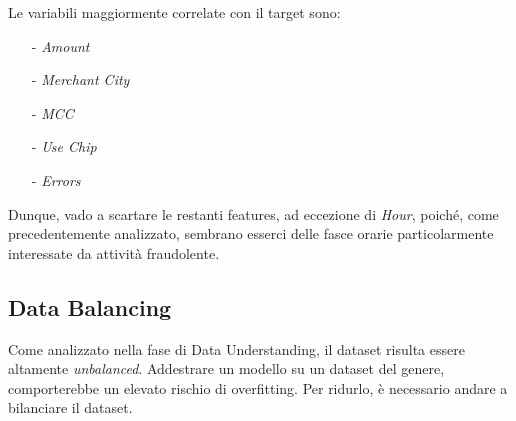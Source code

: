 \documentclass[]{article}
\begin{document}
        Le variabili maggiormente correlate con il target sono:
        \begin{itemize}
            \item [-] \textit{Amount}
            \item [-] \textit{Merchant City}
            \item [-] \textit{MCC}
            \item [-] \textit{Use Chip}
            \item [-] \textit{Errors}
        \end{itemize}
        Dunque, vado a scartare le restanti features, ad eccezione di \textit{Hour}, poiché, come precedentemente analizzato, sembrano esserci delle fasce orarie particolarmente interessate da attività fraudolente.
    \subsection{Data Balancing}
        Come analizzato nella fase di Data Understanding, il dataset risulta essere altamente \textit{unbalanced}. Addestrare un modello su un dataset del genere, comporterebbe un elevato rischio di overfitting. Per ridurlo, è necessario andare a bilanciare il dataset.
\end{document}
